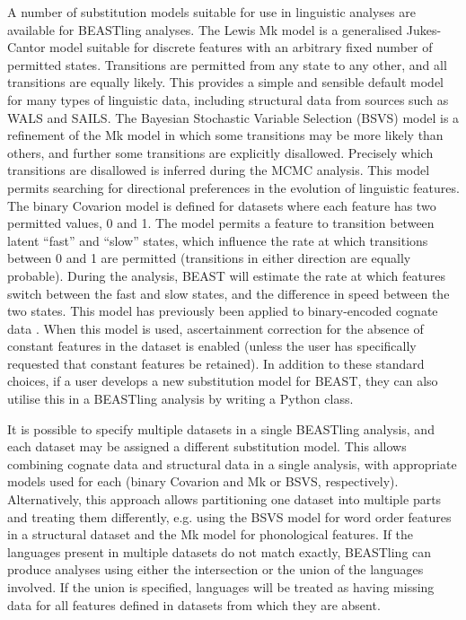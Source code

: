 \documentclass[twocolumn,10pt]{scrartcl}
\begin{document}
A number of substitution models suitable for use in linguistic analyses are available for BEASTling analyses.  The Lewis Mk model\cite{Lewis2001} is a generalised Jukes-Cantor model suitable for discrete features with an arbitrary fixed number of permitted states.  Transitions are permitted from any state to any other, and all transitions are equally likely.  This provides a simple and sensible default model for many types of linguistic data, including structural data from sources such as WALS\cite{Dryer2013} and SAILS\cite{Muysken2014}.  The Bayesian Stochastic Variable Selection (BSVS) model is a refinement of the Mk model in which some transitions may be more likely than others, and further some transitions are explicitly disallowed.  Precisely which transitions are disallowed is inferred during the MCMC analysis.  This model permits searching for directional preferences in the evolution of linguistic features.  The binary Covarion model\cite{Penny2001} is defined for datasets where each feature has two permitted values, 0 and 1.  The model permits a feature to transition between latent ``fast'' and ``slow'' states, which influence the rate at which transitions between 0 and 1 are permitted (transitions in either direction are equally probable).  During the analysis, BEAST will estimate the rate at which features switch between the fast and slow states, and the difference in speed between the two states.  This model has previously been applied to binary-encoded cognate data \cite{Gray2009,Bouckaert2012}.  When this model is used, ascertainment correction for the absence of constant features in the dataset is enabled (unless the user has specifically requested that constant features be retained).  In addition to these standard choices, if a user develops a new substitution model for BEAST, they can also utilise this in a BEASTling analysis by writing a Python class.

It is possible to specify multiple datasets in a single BEASTling analysis, and each dataset may be assigned a different substitution model.  This allows combining cognate data and structural data in a single analysis, with appropriate models used for each (binary Covarion and Mk or BSVS, respectively).  Alternatively, this approach allows partitioning one dataset into multiple parts and treating them differently, e.g. using the BSVS model for word order features in a structural dataset and the Mk model for phonological features.  If the languages present in multiple datasets do not match exactly, BEASTling can produce analyses using either the intersection or the union of the languages involved.  If the union is specified, languages will be treated as having missing data for all features defined in datasets from which they are absent.
\end{document}
